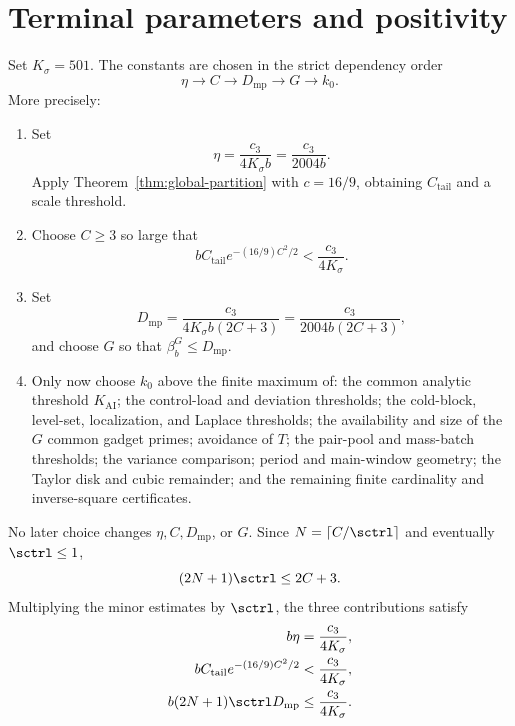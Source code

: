 \section{Terminal parameters and positivity}\label{sec:terminal}

Set $K_\sigma=501$.  The constants are chosen in the strict dependency order
\begin{equation}\label{eq:parameter-order}
 \eta\longrightarrow C\longrightarrow D_{\mathrm{mp}}
 \longrightarrow G\longrightarrow k_0.
\end{equation}
More precisely:
\begin{enumerate}[label=\textbf{Step \arabic*.}]
\item Set
\begin{equation}\label{eq:eta-choice}
 \eta=\frac{c_3}{4K_\sigma b}
 =\frac{c_3}{2004b}.
\end{equation}
Apply Theorem~\ref{thm:global-partition} with $c=16/9$, obtaining
$C_{\mathrm{tail}}$ and a scale threshold.
\item Choose $C\ge3$ so large that
\begin{equation}\label{eq:gaussian-quarter}
 bC_{\mathrm{tail}}e^{-(16/9)C^2/2}
 <\frac{c_3}{4K_\sigma}.
\end{equation}
\item Set
\begin{equation}\label{eq:Dmp}
 D_{\mathrm{mp}}
 =\frac{c_3}{4K_\sigma b(2C+3)}
 =\frac{c_3}{2004b(2C+3)},
\end{equation}
and choose $G$ so that $\beta_b^G\le D_{\mathrm{mp}}$.
\item Only now choose $k_0$ above the finite maximum of: the common analytic
threshold $K_{\mathrm{AI}}$; the control-load and deviation thresholds; the
cold-block, level-set, localization, and Laplace thresholds; the availability
and size of the $G$ common gadget primes; avoidance of $T$; the pair-pool and
mass-batch thresholds; the variance comparison; period and main-window
geometry; the Taylor disk and cubic remainder; and the remaining finite
cardinality and inverse-square certificates.
\end{enumerate}
No later choice changes $\eta,C,D_{\mathrm{mp}}$, or $G$.  Since
$N=\lceil C/\sctrl\rceil$ and eventually $\sctrl\le1$,
\begin{equation}\label{eq:N-bound}
 (2N+1)\sctrl\le2C+3.
\end{equation}
Multiplying the minor estimates by $\sctrl$, the three contributions satisfy
\begin{align}
 b\eta&=\frac{c_3}{4K_\sigma},\label{eq:quarter-one}\\
 bC_{\mathrm{tail}}e^{-(16/9)C^2/2}
 &<\frac{c_3}{4K_\sigma},\label{eq:quarter-two}\\
 b(2N+1)\sctrl D_{\mathrm{mp}}
 &\le\frac{c_3}{4K_\sigma}.
 \label{eq:quarter-three}
\end{align}
